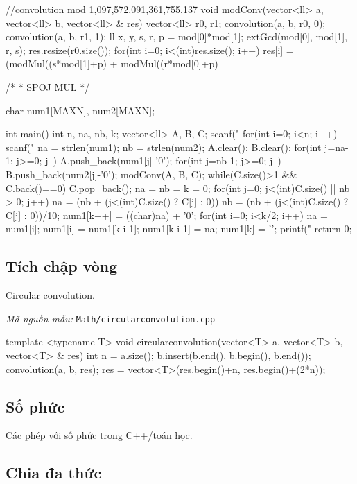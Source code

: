 \documentclass[11pt]{article}
\newcommand{\codepath}[1]{\par\noindent\textit{Mã nguồn mẫu:} \texttt{#1}\par}
\begin{document}
\begin{vncode}
//convolution mod 1,097,572,091,361,755,137
void modConv(vector<ll> a, vector<ll> b, vector<ll> & res) {
	vector<ll> r0, r1;
	convolution(a, b, r0, 0);
	convolution(a, b, r1, 1);
	ll x, y, s, r, p = mod[0]*mod[1];
	extGcd(mod[0], mod[1], r, s);
	res.resize(r0.size());
	for(int i=0; i<(int)res.size(); i++) {
		res[i] = (modMul((s*mod[1]+p)%
		+ modMul((r*mod[0]+p)%
	}
}

/*
 * SPOJ MUL
 */

char num1[MAXN], num2[MAXN];

int main()
{
	int n, na, nb, k;
	vector<ll> A, B, C;
	scanf("%
	for(int i=0; i<n; i++) {
		scanf(" %
		na = strlen(num1);
		nb = strlen(num2);
		A.clear();
		B.clear();
		for(int j=na-1; j>=0; j--) {
			A.push_back(num1[j]-'0');
		}
		for(int j=nb-1; j>=0; j--) {
			B.push_back(num2[j]-'0');
		}
		modConv(A, B, C);
		while(C.size()>1 && C.back()==0) C.pop_back();
		na = nb = k = 0;
		for(int j=0; j<(int)C.size() || nb > 0; j++) {
			na = (nb + (j<(int)C.size() ? C[j] : 0))%
			nb = (nb + (j<(int)C.size() ? C[j] : 0))/10;
			num1[k++] = ((char)na) + '0';
		}
		for(int i=0; i<k/2; i++) {
			na = num1[i];
			num1[i] = num1[k-i-1];
			num1[k-i-1] = na;
		}
		num1[k] = '\0';
		printf("%
	}
	return 0;
}
\end{vncode}
\endgroup


\subsection{Tích chập vòng}

Circular convolution.

\codepath{Math/circularconvolution.cpp}

\begingroup\scriptsize
\begin{vncode}
template <typename T>
void circularconvolution(vector<T> a, vector<T> b, vector<T> & res) {
	int n = a.size();
	b.insert(b.end(), b.begin(), b.end());
	convolution(a, b, res);
	res = vector<T>(res.begin()+n, res.begin()+(2*n));
}
\end{vncode}
\endgroup


\subsection{Số phức}

Các phép với số phức trong C++/toán học.

\subsection{Chia đa thức}
\end{document}
